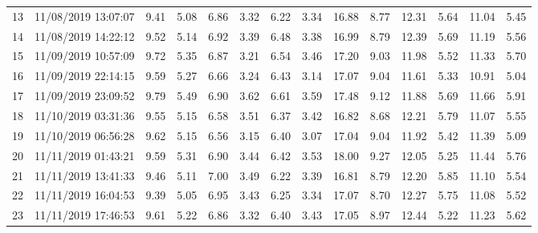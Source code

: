 \documentclass[a4paper,12pt]{article}
\begin{document}
\begin{landscape}
\begin{table}[!h]
\begin{center}
\begin{tabular}{@{} l l c c c c c c c c c c c c}
13 & 11/08/2019 13:07:07 & 9.41 & 5.08 & 6.86 & 3.32 & 6.22 & 3.34 & 16.88 & 8.77 & 12.31 & 5.64 & 11.04 & 5.45 \\
14 & 11/08/2019 14:22:12 & 9.52 & 5.14 & 6.92 & 3.39 & 6.48 & 3.38 & 16.99 & 8.79 & 12.39 & 5.69 & 11.19 & 5.56 \\
15 & 11/09/2019 10:57:09 & 9.72 & 5.35 & 6.87 & 3.21 & 6.54 & 3.46 & 17.20 & 9.03 & 11.98 & 5.52 & 11.33 & 5.70 \\
16 & 11/09/2019 22:14:15 & 9.59 & 5.27 & 6.66 & 3.24 & 6.43 & 3.14 & 17.07 & 9.04 & 11.61 & 5.33 & 10.91 & 5.04 \\
17 & 11/09/2019 23:09:52 & 9.79 & 5.49 & 6.90 & 3.62 & 6.61 & 3.59 & 17.48 & 9.12 & 11.88 & 5.69 & 11.66 & 5.91 \\
18 & 11/10/2019 03:31:36 & 9.55 & 5.15 & 6.58 & 3.51 & 6.37 & 3.42 & 16.82 & 8.68 & 12.21 & 5.79 & 11.07 & 5.55 \\
19 & 11/10/2019 06:56:28 & 9.62 & 5.15 & 6.56 & 3.15 & 6.40 & 3.07 & 17.04 & 9.04 & 11.92 & 5.42 & 11.39 & 5.09 \\
20 & 11/11/2019 01:43:21 & 9.59 & 5.31 & 6.90 & 3.44 & 6.42 & 3.53 & 18.00 & 9.27 & 12.05 & 5.25 & 11.44 & 5.76 \\
21 & 11/11/2019 13:41:33 & 9.46 & 5.11 & 7.00 & 3.49 & 6.22 & 3.39 & 16.81 & 8.79 & 12.20 & 5.85 & 11.10 & 5.54 \\
22 & 11/11/2019 16:04:53 & 9.39 & 5.05 & 6.95 & 3.43 & 6.25 & 3.34 & 17.07 & 8.70 & 12.27 & 5.75 & 11.08 & 5.52 \\
23 & 11/11/2019 17:46:53 & 9.61 & 5.22 & 6.86 & 3.32 & 6.40 & 3.43 & 17.05 & 8.97 & 12.44 & 5.22 & 11.23 & 5.62
    \end{tabular}
 \label{tab:velocitymodel}
\end{center}
\end{table}

\end{landscape}
\end{document}
